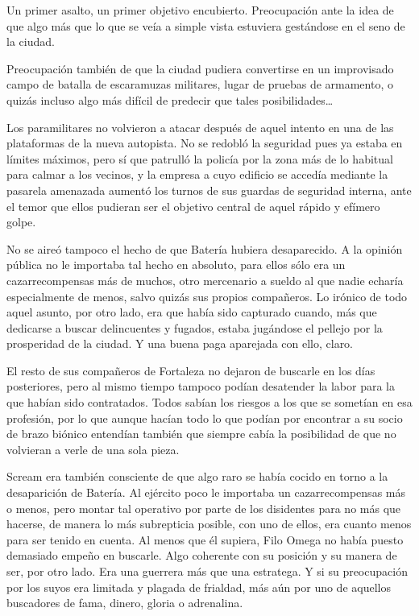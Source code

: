 Un primer asalto, un primer objetivo encubierto. Preocupación ante la idea de que algo más que lo que se veía a simple vista estuviera gestándose en el seno de la ciudad.

Preocupación también de que la ciudad pudiera convertirse en un improvisado campo de batalla de escaramuzas militares, lugar de pruebas de armamento, o quizás incluso algo más difícil de predecir que tales posibilidades\dots

\fancyparbreak
Los paramilitares no volvieron a atacar después de aquel intento en una de las plataformas de la nueva autopista. No se redobló la seguridad pues ya estaba en límites máximos, pero sí que patrulló la policía por la zona más de lo habitual para calmar a los vecinos, y la empresa a cuyo edificio se accedía mediante la pasarela amenazada aumentó los turnos de sus guardas de seguridad interna, ante el temor que ellos pudieran ser el objetivo central de aquel rápido y efímero golpe.

No se aireó tampoco el hecho de que Batería hubiera desaparecido. A la opinión pública no le importaba tal hecho en absoluto, para ellos sólo era un cazarrecompensas más de muchos, otro mercenario a sueldo al que nadie echaría especialmente de menos, salvo quizás sus propios compañeros. Lo irónico de todo aquel asunto, por otro lado, era que había sido capturado cuando, más que dedicarse a buscar delincuentes y fugados, estaba jugándose el pellejo por la prosperidad de la ciudad. Y una buena paga aparejada con ello, claro.

El resto de sus compañeros de Fortaleza no dejaron de buscarle en los días posteriores, pero al mismo tiempo tampoco podían desatender la labor para la que habían sido contratados. Todos sabían los riesgos a los que se sometían en esa profesión, por lo que aunque hacían todo lo que podían por encontrar a su socio de brazo biónico entendían también que siempre cabía la posibilidad de que no volvieran a verle de una sola pieza.

Scream era también consciente de que algo raro se había cocido en torno a la desaparición de Batería. Al ejército poco le importaba un cazarrecompensas más o menos, pero montar tal operativo por parte de los disidentes para no más que hacerse, de manera lo más subrepticia posible, con uno de ellos, era cuanto menos para ser tenido en cuenta. Al menos que él supiera, Filo Omega no había puesto demasiado empeño en buscarle. Algo coherente con su posición y su manera de ser, por otro lado. Era una guerrera más que una estratega. Y si su preocupación por los suyos era limitada y plagada de frialdad, más aún por uno de aquellos buscadores de fama, dinero, gloria o adrenalina.

